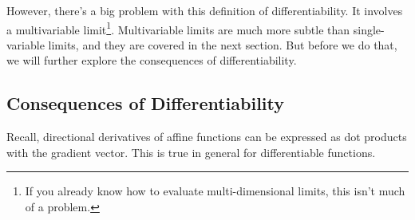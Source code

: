 However, there's a big problem with this definition of differentiability.  It
involves a multivariable limit\footnote{ If you already know how to evaluate
multi-dimensional limits, this isn't much of a problem.}.  Multivariable limits
are much more subtle than single-variable limits, and they are covered in the next
section.  But before we do that, we will further explore the consequences of 
differentiability.

\subsection{Consequences of Differentiability}

Recall, directional derivatives of affine functions can be expressed
as dot products with the gradient vector.  This is true in general
for differentiable functions.

